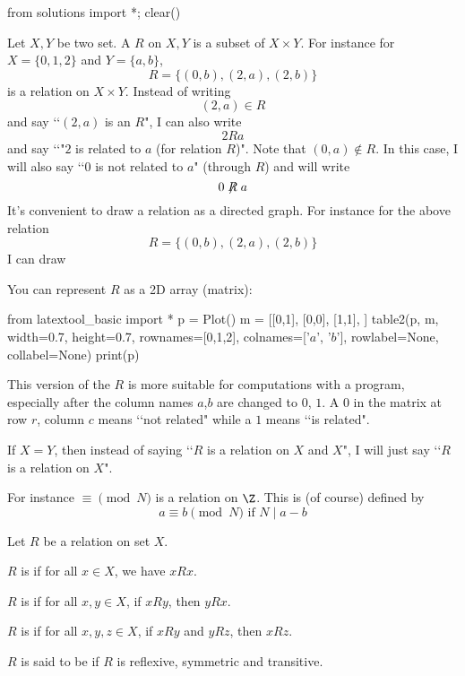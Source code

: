\begin{python0}
from solutions import *; clear()
\end{python0}

Let $X, Y$ be two set.
A  $R$ on $X,Y$ is a subset of $X \times Y$.
For instance for $X = \{0, 1, 2\}$ and $Y = \{a, b\}$,
\[
R = \{(0, b), (2, a), (2, b)\}
\]
is a relation on $X \times Y$.
Instead of writing
\[
(2, a) \in R
\]
and say \lq\lq $(2, a)$ is an $R$",
I can also write
\[
2 R a
\]
and say
\lq\lq"$2$ is related to $a$ (for relation $R$)".
Note that $(0, a) \not\in R$.
In this case, I will also say \lq\lq $0$ is not related to $a$" (through $R$)
and will write
\[
0 \not \mathrel{R} a
\]
It's convenient to draw a relation as a directed graph.
For instance for the above relation
\[
R = \{(0, b), (2, a), (2, b)\}
\]
I can draw
You can represent $R$ as a 2D array (matrix):
\begin{python}
from latextool_basic import *
p = Plot()
m = [[0,1],
     [0,0],
     [1,1],
]
table2(p, m, width=0.7, height=0.7,
rownames=[0,1,2],
colnames=['$a$', '$b$'],
rowlabel=None, collabel=None)
print(p)
\end{python}
This version of the $R$ is more suitable for computations
with a program, especially after the column names $a$,$b$ are changed to
$0$, $1$.
A $0$ in the matrix at row $r$, column $c$ means \lq\lq not related"
while a $1$ means \lq\lq is related".

If $X = Y$, then
instead of saying
\lq\lq $R$ is a relation on $X$ and $X$",
I will just say \lq\lq $R$ is a relation on $X$".

For instance $\equiv {}$ is a relation on $\Z$.
This is (of course) defined by
\[
a \equiv b \pmod{N} \text{ if } N \mid a - b
\]

\begin{defn}
Let $R$ be a relation on set $X$.
\begin{myenum}
\item $R$ is  if for all $x \in X$, we have $x R x$.
\item $R$ is  if for all $x, y \in X$, if $x R y$, then $y R x$.
\item $R$ is  if for all $x, y,z \in X$, if $x R y$ and $y R z$, then $x R z$.
\end{myenum}
$R$ is said to be  if $R$ is reflexive, symmetric and transitive.
\end{defn}


